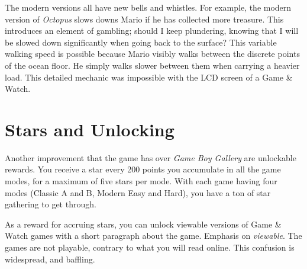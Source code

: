 \documentclass{book}
\let\oldcenter\center
\let\oldendcenter\endcenter
\renewenvironment{center}{\setlength\topsep{0pt}\oldcenter}{\oldendcenter}
\begin{document}
\begin{center}
\quad\vspace{4pt}
\quad\vspace{4pt}
\quad\vspace{4pt}
\end{center}

The modern versions all have new bells and whistles. For example, the modern version of \emph{Octopus} slows downs Mario if he has collected more treasure. This introduces an element of gambling; should I keep plundering, knowing that I will be slowed down significantly when going back to the surface? This variable walking speed is possible because Mario visibly walks between the discrete points of the ocean floor. He simply walks slower between them when carrying a heavier load. This detailed mechanic was impossible with the LCD screen of a Game \& Watch.

\FloatBarrier\needspace{10mm}\section*{Stars and Unlocking}\nopagebreak[4]

Another improvement that the game has over \emph{Game Boy Gallery} are unlockable rewards. You receive a star every 200 points you accumulate in all the game modes, for a maximum of five stars per mode. With each game having four modes (Classic A and B, Modern Easy and Hard), you have a ton of star gathering to get through.

As a reward for accruing stars, you can unlock viewable versions of Game \& Watch games with a short paragraph about the game. Emphasis on \emph{viewable}. The games are not playable, contrary to what you will read online. This confusion is widespread, and baffling.
\end{document}
